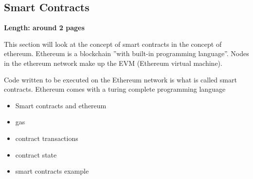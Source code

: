 \subsection{Smart Contracts}
\label{subsec:02_smart_contracts}

\textbf{Length: around 2 pages}

This section will look at the concept of smart contracts in the concept of ethereum.
Ethereum is a blockchain ''with built-in programming language''. Nodes in the ethereum network make up the EVM (Ethereum virtual machine).

Code written to be executed on the Ethereum network is what is called smart contracts.
Ethereum comes with a turing complete programming language

\begin{itemize}
  \item Smart contracts and ethereum
  \item gas
  \item contract transactions
  \item contract state
  \item smart contracts example
\end{itemize}
